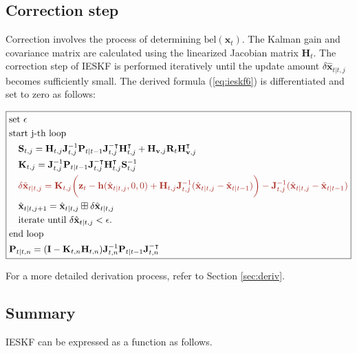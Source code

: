 \documentclass[10pt]{article}
\begin{document}
\subsection{Correction step}
Correction involves the process of determining $\text{bel}(\mathbf{x}_{t})$. The Kalman gain and covariance matrix are calculated using the linearized Jacobian matrix $\mathbf{H}_{t}$. The correction step of IESKF is performed iteratively until the update amount $\delta \hat{\mathbf{x}}_{t|t,j}$ becomes sufficiently small. The derived formula (\ref{eq:ieskf6}) is differentiated and set to zero as follows: 

\begin{equation}  \label{eq:ieskf8}
	\boxed{ \begin{aligned}
			& \text{set } \epsilon \\
			&  \text{start j-th loop }  \\
			& \quad \mathbf{S}_{t,j} = \mathbf{H}_{t,j}\mathbf{J}^{-1}_{t,j} \mathbf{P}_{t|t-1} \mathbf{J}^{-\intercal}_{t,j}\mathbf{H}_{t,j}^{\intercal} + \mathbf{H}_{\mathbf{v},j}\mathbf{R}_{t}\mathbf{H}_{\mathbf{v},j}^{\intercal} \\ 
			&  \quad   \mathbf{K}_{t,j} = \mathbf{J}^{-1}_{t,j} \mathbf{P}_{t|t-1} \mathbf{J}^{-\intercal}_{t,j}\mathbf{H}_{t,j}^{\intercal}\mathbf{S}_{t,j}^{-1} \\
			& {\color{Mahogany} \quad \delta \hat{\mathbf{x}}_{t|t,j} = \mathbf{K}_{t,j} \bigg(  \mathbf{z}_{t} - \mathbf{h}(\hat{\mathbf{x}}_{t|t,j}, 0 ,0) + \mathbf{H}_{t,j}\mathbf{J}^{-1}_{t,j}(\hat{\mathbf{x}}_{t|t,j} - \hat{\mathbf{x}}_{t|t-1}) \bigg) - \mathbf{J}^{-1}_{t,j}(\hat{\mathbf{x}}_{t|t,j} - \hat{\mathbf{x}}_{t|t-1}) }\\
			& \quad \hat{\mathbf{x}}_{t|t, j+1}  = \hat{\mathbf{x}}_{t|t, j} \boxplus \delta \hat{\mathbf{x}}_{t|t,j} \\
			& \quad \text{iterate until } \delta \hat{\mathbf{x}}_{t|t,j} < \epsilon.   \\ 
			& \text{end loop} \\ 
			&     \mathbf{P}_{t|t,n}    = (\mathbf{I} - \mathbf{K}_{t,n}\mathbf{H}_{t,n}) \mathbf{J}^{-1}_{t,n}\mathbf{P}_{t|t-1} \mathbf{J}_{t,n}^{-\intercal} \\
	\end{aligned} }
\end{equation}

For a more detailed derivation process, refer to Section \ref{sec:deriv}.


\subsection{Summary}
IESKF can be expressed as a function as follows.
	
\end{document}
